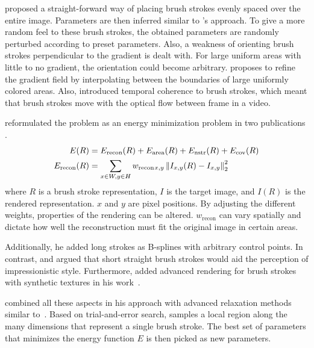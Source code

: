 \citeauthor*{apple} proposed a straight-forward way of placing brush strokes evenly spaced over the entire image.
Parameters are then inferred similar to \citeauthor*{paintbynumbers}'s approach.
To give a more random feel to these brush strokes, the obtained parameters are randomly perturbed according to preset parameters.
Also, a weakness of orienting brush strokes perpendicular to the gradient is dealt with.
For large uniform areas with little to no gradient, the orientation could become arbitrary.
\citeauthor*{apple} proposes to refine the gradient field by interpolating between the boundaries of large uniformly colored areas.
Also, \citeauthor*{apple} introduced temporal coherence to brush strokes, which meant that brush strokes move with the optical flow between frame in a video.

\citeauthor*{hertzmann} reformulated the problem as an energy minimization problem in two publications \cite{hertzmannreview, Hertzmann}.
\begin{align}
    E(R) & = E_{\text{recon}}(R) + E_{\text{area}}(R) + E_{\text{nstr}}(R) + E_{\text{cov}}(R) \\
    E_{\text{recon}}(R) & = \sum_{x \in W, y \in H} w_{\text{recon}}{}_{x, y} \left\lVert I_{x, y}(R) - I_{x, y}\right\rVert^2_2 \\
\end{align}
where $R$ is a brush stroke representation, $I$ is the target image, and $I(R)$ is the rendered representation.
$x$ and $y$ are pixel positions.
By adjusting the different weights, properties of the rendering can be altered.
$w_{\text{recon}}$ can vary spatially and dictate how well the reconstruction must fit the original image in certain areas.

Additionally, he added long strokes as B-splines with arbitrary control points.
In contrast, \citeauthor*{paintbynumbers} and \citeauthor*{apple} argued that short straight brush strokes would aid the perception of impressionistic style.
Furthermore, \citeauthor*{Hertzmann} added advanced rendering for brush strokes with synthetic textures in his work~\cite{Hertzmann}.

\citeauthor*{Hertzmann} combined all these aspects in his approach with advanced relaxation methods similar to~\citeauthor*{paintbynumbers}.
Based on trial-and-error search, \citeauthor*{Hertzmann} samples a local region along the many dimensions that represent a single brush stroke.
The best set of parameters that minimizes the energy function $E$ is then picked as new parameters.

